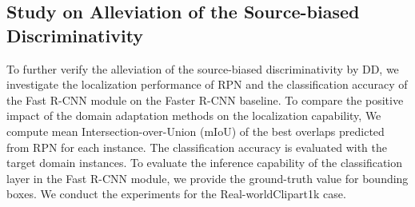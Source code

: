 \documentclass[10pt,twocolumn,letterpaper]{article}
\begin{document}
\subsection{Study on Alleviation of the Source-biased Discriminativity} \label{sec:DDcls}
To further verify the alleviation of the source-biased discriminativity by DD, we investigate the localization performance of RPN and the classification accuracy of the Fast R-CNN module on the Faster R-CNN baseline.
To compare the positive impact of the domain adaptation methods on the localization capability, We compute mean Intersection-over-Union (mIoU) of the best overlaps predicted from RPN for each instance.
The classification accuracy is evaluated with the target domain instances.
To evaluate the inference capability of the classification layer in the Fast R-CNN module, we provide the ground-truth value for bounding boxes.
We conduct the experiments for the Real-worldClipart1k case.
\end{document}

